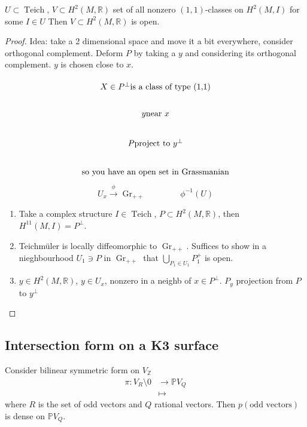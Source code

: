 \begin{coro}
	$U\subset \operatorname{Teich}$, $V\subset H^{2}(M,\mathbb{R})$ set of all nonzero $(1,1)$-classes on $H^{2}(M,I)$ for some $I\in U$ Then $V\subset H^{2}(M,\mathbb{R})$ is open.
\end{coro}

\begin{proof}
Idea: take a 2 dimensional space and move it a bit everywhere, consider orthogonal complement. Deform $P$ by taking a $y$ and considering its orthogonal complement. $y$ is chosen close to $x$.

\[\begin{tikzcd}
	X\in P^\perp \text{is a class of type (1,1)}\\
	y \text{near }x\\
	P \text{project to }y^\perp \\
	\text{so you have an open set in Grassmanian} 
\end{tikzcd}\]
\[U_x\overset{\phi}{\longrightarrow}\operatorname{Gr}_{++}\qquad \qquad \phi^{-1}(U)\]


	\begin{enumerate}[label=\textbf{Step \arabic*}]
		\item 	Take a complex structure $I\in\operatorname{Teich}$, $P\subset H^{2}(M,\mathbb{R})$, then $H^{11}(M,I)=P^\perp$.

			\item Teichmüler is locally diffeomorphic to $\operatorname{Gr}_{++}$. Suffices to show in a nieghbourhood $U_1 \ni P$ in $\operatorname{Gr}_{++}$ that $\bigcup_{P_1\in U_1}P_1^+ $ is open.

		\item $y\in H^{2}(M,\mathbb{R})$, $y\in U_x$, nonzero in a neighb of $x\in P^\perp$. $P_y$ projection from $P$ to $y^\perp$
	\end{enumerate}
\end{proof}

\subsection{Intersection form on a K3 surface}

\begin{lemma}
	Consider bilinear symmetric form on $V_\mathbb{Z}$
	\begin{align*}
		\pi:V_R\setminus 0  &\longrightarrow \mathbb{P}V_Q \\
		 &\longmapsto 
	\end{align*}
	where $R$ is the set of odd vectors and $Q$ rational vectors. Then  $p(\text{odd vectors} )$ is dense on $\mathbb{P}V_Q$.
	
\end{lemma}

